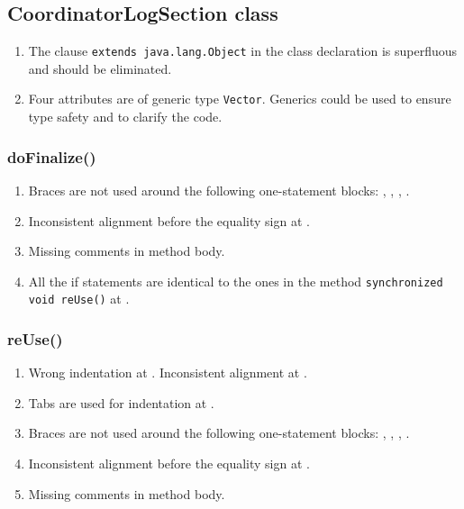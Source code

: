 \subsection{CoordinatorLogSection class}
\label{sec:coordinatorlogsection-class}

\begin{enumerate}
    \item The clause \texttt{extends java.lang.Object} in the class declaration is superfluous and should be eliminated.
    \item {} Four attributes are of generic type \texttt{Vector}. Generics could be used to ensure type safety and to clarify the code.
\end{enumerate}

\subsubsection{doFinalize()}
\begin{enumerate}
    \item {} Braces are not used around the following one-statement blocks: , , , .
    \item {} Inconsistent alignment before the equality sign at .
    \item {} Missing comments in method body.
    \item {} All the if statements are identical to the ones in the method \texttt{\footnotesize synchronized void reUse()} at .
\end{enumerate}

\subsubsection{reUse()}
\begin{enumerate}
    \item {} Wrong indentation at . Inconsistent alignment at .
    \item {} Tabs are used for indentation at .
    \item {} Braces are not used around the following one-statement blocks: , , , .
    \item {} Inconsistent alignment before the equality sign at .
    \item {} Missing comments in method body.
\end{enumerate}


